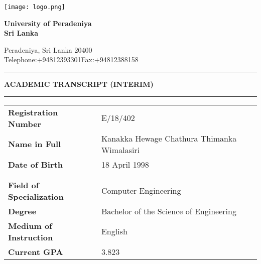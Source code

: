 \documentclass[12pt]{article}
\begin{document}
\noindent
\begin{minipage}[H]{0.17\linewidth}
\centering
\texttt{[image: logo.png]}
\end{minipage}%
\hfill
  \begin{minipage}[H]{0.8\linewidth}
{\fontsize{28}{30}\selectfont \textbf{University of Peradeniya\\Sri Lanka}}

\Large Peradeniya, Sri Lanka 20400\\
{\fontsize{12}{30}\selectfont Telephone:+94812393301\hfill Fax:+94812388158}


  \end{minipage}

\vspace{10pt}
\noindent\rule{\textwidth}{1pt}
\vspace{-15pt}
\begin{center}
{\fontsize{21}{30}\selectfont \textbf{ACADEMIC TRANSCRIPT (INTERIM)}}
\end{center}

\vspace{-12.5pt}

\noindent\rule{\textwidth}{1pt}

\begin{table}[H]
\begin{tabularx}{\textwidth}{Xl}
\textbf{Registration Number} & E/18/402 \\
\textbf{Name in Full} & Kanakka Hewage Chathura Thimanka Wimalasiri \\
\textbf{Date of Birth} & 18 April 1998 \\
\\
\\

\textbf{Field of Specialization} & Computer Engineering \\
\textbf{Degree} & Bachelor of the Science of Engineering \\
\textbf{Medium of Instruction} & English \\
\textbf{Current GPA} & 3.823 \\
\end{tabularx}
\end{table}
\end{document}
